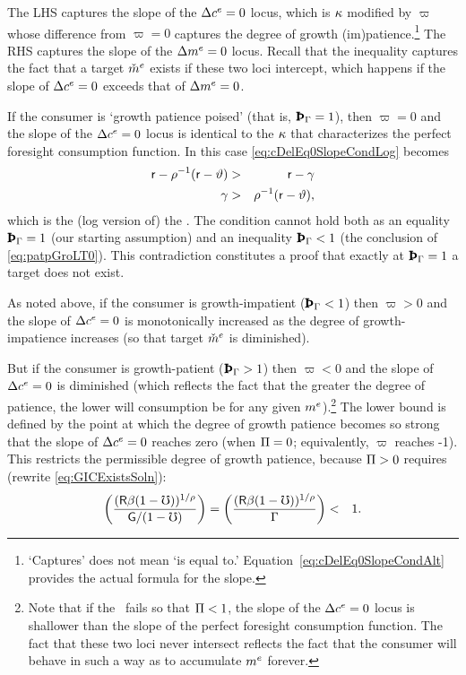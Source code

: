 \documentclass{handout}
\begin{document}
The LHS captures the slope of the $\Delta c^{e}=0$ locus, which is $\kappa$ modified by $\varpi$ whose difference from $\varpi=0$ captures the degree of growth (im)patience.\footnote{`Captures' does not mean `is equal to.'  Equation~\eqref{eq:cDelEq0SlopeCondAlt} provides the actual formula for the slope.}  The RHS captures the slope of the $\Delta m^{e}=0$ locus.  Recall that the inequality captures the fact that a target $\check{m}^{e}$ exists if these two loci intercept, which happens if the slope of $\Delta c^{e}=0$ exceeds that of $\Delta m^{e}=0$.

If the consumer is `growth patience poised' (that is, $\PatPGro = 1$), then $\varpi = 0$ and the slope of the $\Delta c^{e}=0$ locus is identical to the $\kappa$ that characterizes the perfect foresight consumption function.  In this case \eqref{eq:cDelEq0SlopeCondLog} becomes
\begin{eqnarray}
  \mathsf{r}-\rho^{-1}(\mathsf{r}-\vartheta) & > &  \mathsf{r}-\gamma
\\ \gamma & > & \rho^{-1}(\mathsf{r}-\vartheta) \label{eq:patpGroLT0}
,\end{eqnarray}
which is the (log version of) the \GICPGro.  The condition cannot hold both as an equality $\PatPGro=1$ (our starting assumption) and an inequality $\PatPGro < 1$ (the conclusion of \eqref{eq:patpGroLT0}).  This contradiction constitutes a proof that exactly at $\PatPGro=1$ a target does not exist.


As noted above, if the consumer is growth-impatient ($\PatPGro < 1$) then $\varpi > 0$ and the slope of $\Delta c^{e}=0$ is monotonically increased as the degree of growth-impatience increases (so that target $\check{m}^{e}$ is diminished).  

But if the consumer is growth-patient ($\PatPGro > 1$) then $\varpi < 0$ and the slope of $\Delta c^{e}=0$ is diminished (which reflects the fact that the greater the degree of patience, the lower will consumption be for any given $m^{e}$).\footnote{Note that if the \GICPGro~fails so that $\Pi < 1$, the slope of the $\Delta c^{e}=0$ locus is shallower than the slope of the perfect foresight consumption function.  The fact that these two loci never intersect reflects the fact that the consumer will behave in such a way as to accumulate $m^{e}$ forever.}  The lower bound is defined by the point at which the degree of growth patience becomes so strong that the slope of $\Delta c^{e}=0$ reaches zero (when $\Pi=0$; equivalently, $\varpi$ reaches -1).  This restricts the permissible degree of growth patience, because $\Pi > 0$ requires (rewrite \eqref{eq:GICExistsSoln}):
\begin{eqnarray}
  \left(\frac{(\mathsf{R} \beta (1-\mho))^{1/\rho}}{\mathsf{G}/(1-\mho)}\right) = \left(\frac{(\mathsf{R} \beta (1-\mho))^{1/\rho}}{\Gamma}\right) & < & 1
.\end{eqnarray}
\end{document}
